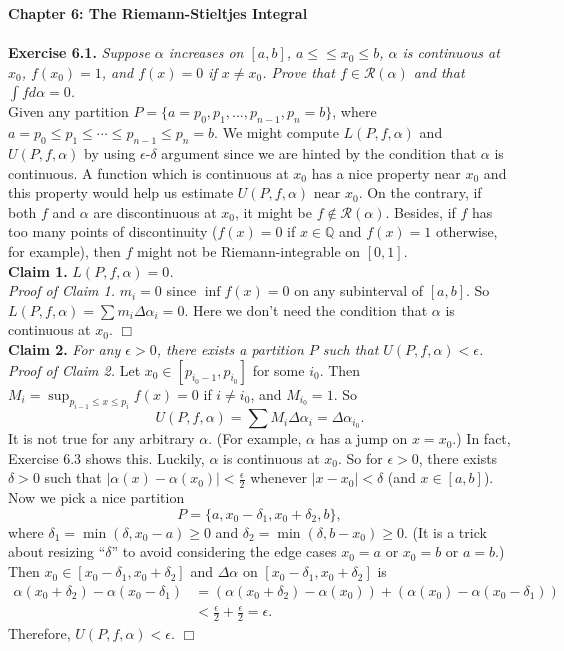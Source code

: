 \documentclass{article}
\begin{document}
\textbf{\Large Chapter 6: The Riemann-Stieltjes Integral} \\\\



\textbf{Exercise 6.1.}
\emph{Suppose $\alpha$ increases on $[a, b]$, $a \leq ≤ x_0 \leq b$,
$\alpha$ is continuous at $x_0$, $f(x_0) = 1$, and $f(x) = 0$ if $x \neq x_0$.
Prove that $f \in \mathscr{R}(\alpha)$ and that $\int f d \alpha = 0$.} \\

Given any partition $P = \{a = p_0, p_1, ..., p_{n-1}, p_n = b \}$,
where $a = p_0 \leq p_1 \leq \cdots \leq p_{n-1} \leq p_n = b$.
We might compute $L(P, f, \alpha)$ and $U(P, f, \alpha)$ by using $\epsilon$-$\delta$ argument
since we are hinted by the condition that $\alpha$ is continuous.
A function which is continuous at $x_0$ has a nice property near $x_0$
and this property would help us estimate $U(P, f, \alpha)$ near $x_0$.
On the contrary, if both $f$ and $\alpha$ are discontinuous at $x_0$,
it might be $f \not\in \mathscr{R}(\alpha)$.
Besides, if $f$ has too many points of discontinuity
($f(x) = 0$ if $x \in \mathbb{Q}$ and $f(x) = 1$ otherwise, for example),
then $f$ might not be Riemann-integrable on $[0, 1]$. \\

\textbf{Claim 1.}
\emph{$L(P, f, \alpha) = 0$.} \\
\emph{Proof of Claim 1.}
$m_i = 0$ since $\inf f(x) = 0$ on any subinterval of $[a, b]$.
So $L(P, f, \alpha) = \sum m_i \Delta \alpha_i = 0$.
Here we don't need the condition that $\alpha$ is continuous at $x_0$.
$\Box$ \\

\textbf{Claim 2.}
\emph{For any $\epsilon > 0$,
there exists a partition $P$ such that $U(P, f, \alpha) < \epsilon$.} \\
\emph{Proof of Claim 2.}
Let $x_0 \in [p_{i_0 - 1}, p_{i_0}]$ for some $i_0$. Then
$M_i = \sup_{p_{i - 1} \leq x \leq p_i} f(x) = 0$ if $i \neq i_0$, and $M_{i_0} = 1$.
So
$$U(P, f, \alpha) = \sum M_i \Delta \alpha_i = \Delta \alpha_{i_0}.$$
It is not true for any arbitrary $\alpha$. (For example, $\alpha$ has a jump on $x = x_0$.)
In fact, Exercise 6.3 shows this.
Luckily, $\alpha$ is continuous at $x_0$. So for $\epsilon > 0$,
there exists $\delta > 0$ such that $|\alpha(x) - \alpha(x_0)| < \frac{\epsilon}{2}$
whenever $|x - x_0| < \delta$ (and $x \in [a, b]$).
Now we pick a nice partition
$$P = \{ a, x_0 - \delta_1, x_0 + \delta_2, b \},$$
where $\delta_1 = \min(\delta, x_0 - a) \geq 0$
and $\delta_2 = \min(\delta, b - x_0) \geq 0$.
(It is a trick about resizing ``$\delta$''
to avoid considering the edge cases $x_0 = a$ or $x_0 = b$ or $a = b$.)
Then $x_0 \in [x_0 - \delta_1, x_0 + \delta_2]$
and $\Delta \alpha$ on $[x_0 - \delta_1, x_0 + \delta_2]$ is
\begin{align*}
\alpha(x_0 + \delta_2) - \alpha(x_0 - \delta_1)
&= (\alpha(x_0 + \delta_2) - \alpha(x_0)) + (\alpha(x_0) - \alpha(x_0 - \delta_1)) \\
&< \frac{\epsilon}{2} + \frac{\epsilon}{2} = \epsilon.
\end{align*}
Therefore, $U(P, f, \alpha) < \epsilon$.
$\Box$ \\
\end{document}
